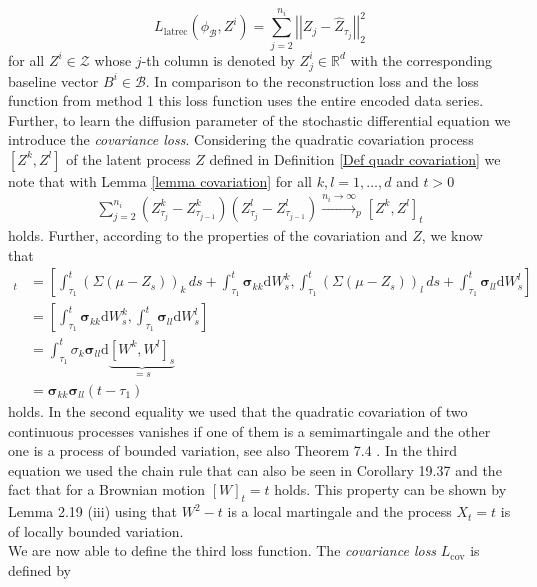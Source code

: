\documentclass[11pt,titlepage]{article}
\newcommand{\R}{\mathbb{R}} %
\newcommand{\abs}[1]{{\left| #1 \right|}}
\theoremstyle{definition}
\theoremstyle{remark}
\begin{document}
	\[L_\mathrm{latrec}(\phi_\mathcal{B}, Z^i) = \sum_{j=2}^{n_i}\abs{\abs{Z_j - \hat{Z}_{\tau_j}}}^2_2\]
	for all $Z^i\in\mathcal{Z}$ whose $j$-th column is denoted by $Z^i_j\in\R^{d}$ with the  corresponding baseline vector $B^i\in\mathcal{B}$. In comparison to the reconstruction loss and the loss function from method 1 this loss function uses the entire encoded data series.\\ 
	Further, to learn the diffusion parameter of the stochastic differential equation we introduce the \textsl{covariance loss}. 
	Considering the quadratic covariation process $[Z^k, Z^l]$ of the latent process $Z$ defined in Definition \ref{Def quadr covariation} we note that with Lemma \ref{lemma covariation} for all $k,l=1,\ldots,d$ and $t>0$
	\begin{align*}
		\sum\limits_{j=2}^{n_i} (Z^k_{\tau_j}-Z^k_{\tau_{j-1}})(Z^l_{\tau_{j}}-Z^l_{\tau_{j-1}}) \xrightarrow{n_i \rightarrow \infty}_p [Z^k,Z^l]_t
	\end{align*}
	holds. Further, according to the properties of the covariation and $Z$, we know that
	\begin{align*}
		[Z^k,Z^l]_t &= \left[ \int_{\tau_1}^t (\Sigma(\mu - Z_s))_k \, ds + \int_{\tau_1}^t \boldsymbol{\sigma}_{kk} \mathrm{d}W_s^k, \int_{\tau_1}^t (\Sigma(\mu - Z_s))_l \, ds + \int_{\tau_1}^t \boldsymbol{\sigma}_{ll} \mathrm{d}W_s^l \right]\\
		&= \left[ \int_{\tau_1}^t \boldsymbol{\sigma}_{kk} \mathrm{d}W_s^k, \int_{\tau_1}^t \boldsymbol{\sigma}_{ll} \mathrm{d}W_s^l \right]\\
		&=\int_{\tau_1}^t \sigma_k \boldsymbol{\sigma}_{ll} \mathrm{d}\underbrace{[W^k,W^l]_s}_{=s}\\
		&= \boldsymbol{\sigma}_{kk} \boldsymbol{\sigma}_{ll} (t-\tau_1)
	\end{align*}
	holds. 
	In the second equality we used that the quadratic covariation of two continuous processes vanishes if one of them is a semimartingale and the other one is a process of bounded variation, see also Theorem 7.4 \cite{StoProSchmidt2021}. In the third equation we used the chain rule that can also be seen in Corollary 19.37 \cite{Pfaffelhuber2020} and the fact that for a Brownian motion $[W]_t=t$ holds. This property can be shown by Lemma 2.19 (iii) \cite{Schmidt2021Fima} using that $W^2 -t$ is a local martingale and the process $X_t = t$ is of locally bounded variation. \\
	We are now able to define the third loss function. The \textsl{covariance loss} $L_\mathrm{cov}$ is defined by
\end{document}
